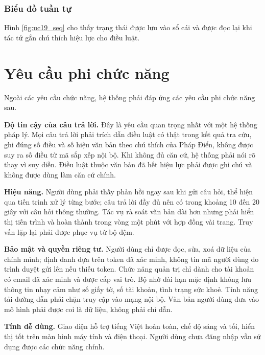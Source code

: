 \documentclass[../DoAn.tex]{subfiles}
\begin{document}

\subsubsection{Biểu đồ tuần tự}
Hình \ref{fig:uc19_seq} cho thấy trạng thái được lưu vào sổ cái và được đọc lại khi tác tử gắn chú thích hiệu lực cho điều luật.



\section{Yêu cầu phi chức năng}
\label{section:2.4}
Ngoài các yêu cầu chức năng, hệ thống phải đáp ứng các yêu cầu phi chức năng sau.

\textbf{Độ tin cậy của câu trả lời.} Đây là yêu cầu quan trọng nhất với một hệ thống pháp lý. Mọi câu trả lời phải trích dẫn điều luật có thật trong kết quả tra cứu, ghi đúng số điều và số hiệu văn bản theo chú thích của Pháp Điển, không được suy ra số điều từ mã sắp xếp nội bộ. Khi không đủ căn cứ, hệ thống phải nói rõ thay vì suy diễn. Điều luật thuộc văn bản đã hết hiệu lực phải được ghi chú và không được dùng làm căn cứ chính.

\textbf{Hiệu năng.} Người dùng phải thấy phản hồi ngay sau khi gửi câu hỏi, thể hiện qua tiến trình xử lý từng bước; câu trả lời đầy đủ nên có trong khoảng 10 đến 20 giây với câu hỏi thông thường. Tác vụ rà soát văn bản dài hơn nhưng phải hiển thị tiến trình và hoàn thành trong vòng một phút với hợp đồng vài trang. Truy vấn lặp lại phải được phục vụ từ bộ đệm.

\textbf{Bảo mật và quyền riêng tư.} Người dùng chỉ được đọc, sửa, xoá dữ liệu của chính mình; định danh dựa trên token đã xác minh, không tin mã người dùng do trình duyệt gửi lên nếu thiếu token. Chức năng quản trị chỉ dành cho tài khoản có email đã xác minh và được cấp vai trò. Bộ nhớ dài hạn mặc định không lưu thông tin nhạy cảm như số giấy tờ, số tài khoản, tình trạng sức khoẻ. Tính năng tải đường dẫn phải chặn truy cập vào mạng nội bộ. Văn bản người dùng đưa vào mô hình phải được coi là dữ liệu, không phải chỉ dẫn.

\textbf{Tính dễ dùng.} Giao diện hỗ trợ tiếng Việt hoàn toàn, chế độ sáng và tối, hiển thị tốt trên màn hình máy tính và điện thoại. Người dùng chưa đăng nhập vẫn sử dụng được các chức năng chính.
\end{document}
